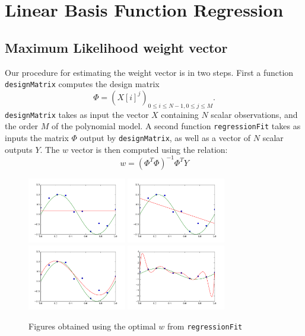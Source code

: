 \section{Linear Basis Function Regression}

\subsection{Maximum Likelihood weight vector}
Our procedure for estimating the weight vector is in two steps. First a function {\tt designMatrix} computes the design matrix 
$$\Phi  = \left( X[i] ^j \right)_{0 \leq i \leq N-1, 0 \leq j \leq M}.$$
{\tt designMatrix} takes as input the vector $X$ containing $N$ scalar observations, and the order $M$ of the polynomial model.
A second function {\tt regressionFit} takes as inputs the matrix $\Phi$ output by {\tt designMatrix}, as well as a vector of $N$ scalar outputs $Y$.
The $w$ vector is then computed using the relation:
$$ w = (\Phi^T \Phi)^{-1} \Phi^T Y$$

\begin{figure}[h!]
  \centering
 \includegraphics[width=4.3cm]{../Figures/Q2/M0.png}
\includegraphics[width=4.3cm]{../Figures/Q2/M1.png}
 \includegraphics[width=4.3cm]{../Figures/Q2/M3.png}
 \includegraphics[width=4.3cm]{../Figures/Q2/M9.png}
\caption{Figures obtained using the optimal $w$ from {\tt regressionFit}}
\label{Bishop}
\end{figure}

